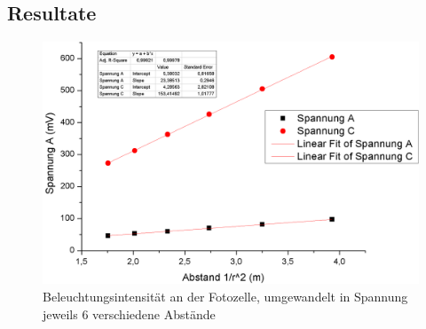 \documentclass[12pt,a4paper]{article}
\begin{document}
\subsection{Resultate}



\begin{figure}[H]
	\centering
	\includegraphics[scale=0.6
	]{data/waermestrahlung.png}
	\caption{Beleuchtungsintensität an der Fotozelle, umgewandelt in Spannung\\
	jeweils 6 verschiedene Abstände}
	\label{fig:waermestrahlung_messung}
\end{figure}
\end{document}
